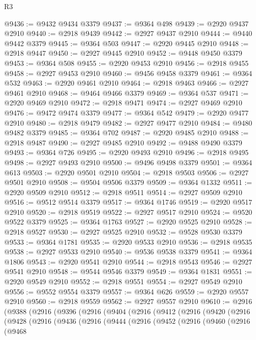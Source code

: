 \begin{lexlean}{R3}
\begin{coremodule}
@9436 := @9432 @9434 @3379
@9437 := @9364 @498
@9439 := @2920 @9437 @2910
@9440 := @2918 @9439
@9442 := @2927 @9437 @2910
@9444 := @9440 @9442 @3379
@9445 := @9364 @503
@9447 := @2920 @9445 @2910
@9448 := @2918 @9447
@9450 := @2927 @9445 @2910
@9452 := @9448 @9450 @3379
@9453 := @9364 @508
@9455 := @2920 @9453 @2910
@9456 := @2918 @9455
@9458 := @2927 @9453 @2910
@9460 := @9456 @9458 @3379
@9461 := @9364 @532
@9463 := @2920 @9461 @2910
@9464 := @2918 @9463
@9466 := @2927 @9461 @2910
@9468 := @9464 @9466 @3379
@9469 := @9364 @537
@9471 := @2920 @9469 @2910
@9472 := @2918 @9471
@9474 := @2927 @9469 @2910
@9476 := @9472 @9474 @3379
@9477 := @9364 @542
@9479 := @2920 @9477 @2910
@9480 := @2918 @9479
@9482 := @2927 @9477 @2910
@9484 := @9480 @9482 @3379
@9485 := @9364 @702
@9487 := @2920 @9485 @2910
@9488 := @2918 @9487
@9490 := @2927 @9485 @2910
@9492 := @9488 @9490 @3379
@9493 := @9364 @726
@9495 := @2920 @9493 @2910
@9496 := @2918 @9495
@9498 := @2927 @9493 @2910
@9500 := @9496 @9498 @3379
@9501 := @9364 @613
@9503 := @2920 @9501 @2910
@9504 := @2918 @9503
@9506 := @2927 @9501 @2910
@9508 := @9504 @9506 @3379
@9509 := @9364 @1332
@9511 := @2920 @9509 @2910
@9512 := @2918 @9511
@9514 := @2927 @9509 @2910
@9516 := @9512 @9514 @3379
@9517 := @9364 @1746
@9519 := @2920 @9517 @2910
@9520 := @2918 @9519
@9522 := @2927 @9517 @2910
@9524 := @9520 @9522 @3379
@9525 := @9364 @1763
@9527 := @2920 @9525 @2910
@9528 := @2918 @9527
@9530 := @2927 @9525 @2910
@9532 := @9528 @9530 @3379
@9533 := @9364 @1781
@9535 := @2920 @9533 @2910
@9536 := @2918 @9535
@9538 := @2927 @9533 @2910
@9540 := @9536 @9538 @3379
@9541 := @9364 @1806
@9543 := @2920 @9541 @2910
@9544 := @2918 @9543
@9546 := @2927 @9541 @2910
@9548 := @9544 @9546 @3379
@9549 := @9364 @1831
@9551 := @2920 @9549 @2910
@9552 := @2918 @9551
@9554 := @2927 @9549 @2910
@9556 := @9552 @9554 @3379
@9557 := @9364 @626
@9559 := @2920 @9557 @2910
@9560 := @2918 @9559
@9562 := @2927 @9557 @2910
@9610 := @2916
    (@9388
      (@2916
        (@9396
          (@2916
            (@9404
              (@2916
                (@9412
                  (@2916
                    (@9420
                      (@2916
                        (@9428
                          (@2916
                            (@9436
                              (@2916
                                (@9444
                                  (@2916
                                    (@9452
                                      (@2916
                                        (@9460
                                          (@2916
                                            (@9468

\end{coremodule}
\end{lexlean}
